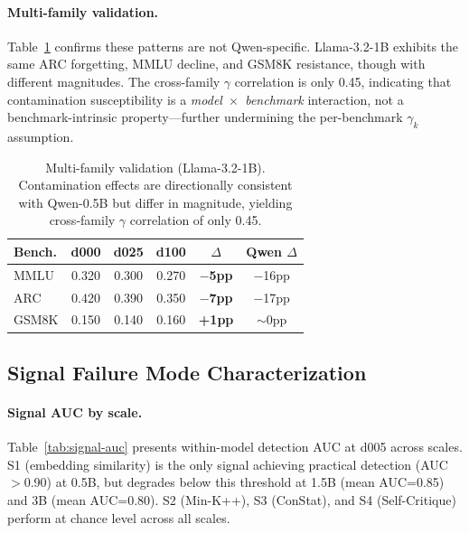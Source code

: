 \documentclass[11pt,a4paper]{article}
\begin{document}
\paragraph{Multi-family validation.}
Table~\ref{tab:multi-family} confirms these patterns are not Qwen-specific.
Llama-3.2-1B exhibits the same ARC forgetting, MMLU decline, and GSM8K resistance, though with different magnitudes.
The cross-family $\gamma$ correlation is only 0.45, indicating that contamination susceptibility is a \emph{model~$\times$~benchmark} interaction, not a benchmark-intrinsic property---further undermining the per-benchmark $\gamma_k$ assumption.

\begin{table}[t]
\centering
\small
\caption{Multi-family validation (Llama-3.2-1B). Contamination effects are directionally consistent with Qwen-0.5B but differ in magnitude, yielding cross-family $\gamma$ correlation of only 0.45.}
\label{tab:multi-family}
\begin{tabular}{lccc>{\bfseries}cc}
\toprule
\textbf{Bench.} & \textbf{d000} & \textbf{d025} & \textbf{d100} & $\Delta$ & \textbf{Qwen $\Delta$} \\
\midrule
MMLU & 0.320 & 0.300 & 0.270 & $-$5pp & $-$16pp \\
ARC & 0.420 & 0.390 & 0.350 & $-$7pp & $-$17pp \\
GSM8K & 0.150 & 0.140 & 0.160 & +1pp & $\sim$0pp \\
\bottomrule
\end{tabular}
\end{table}

\subsection{Signal Failure Mode Characterization}
\label{sec:signals}

\paragraph{Signal AUC by scale.}
Table~\ref{tab:signal-auc} presents within-model detection AUC at d005 across scales.
S1 (embedding similarity) is the only signal achieving practical detection (AUC$>$0.90) at 0.5B, but degrades below this threshold at 1.5B (mean AUC=0.85) and 3B (mean AUC=0.80).
S2 (Min-K++), S3 (ConStat), and S4 (Self-Critique) perform at chance level across all scales.
\end{document}
